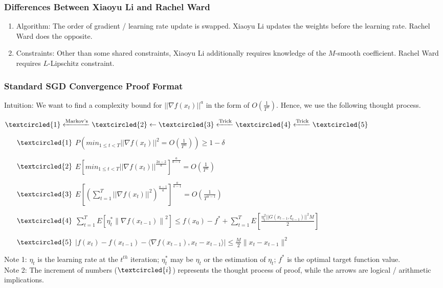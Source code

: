 \documentclass{beamer}
\begin{document}
\begin{frame}
\frametitle{Differences Between Xiaoyu Li and Rachel Ward}
\begin{enumerate}
    \item Algorithm: The order of gradient / learning rate update is swapped. Xiaoyu Li updates the weights before the learning rate. Rachel Ward does the opposite.
    \item Constraints: Other than some shared constraints, Xiaoyu Li additionally requires knowledge of the $M$-smooth coefficient. Rachel Ward requires $L$-Lipschitz constraint.
\end{enumerate}

\end{frame}

\begin{frame}
\frametitle{Standard SGD Convergence Proof Format}
Intuition: We want to find a complexity bound for $||\nabla f(x_t)||^a$ in the form of $O(\frac{1}{T^\alpha})$. Hence, we use the following thought process.\par

$\textcircled{1} \xleftarrow{\text{Markov's}} \textcircled{2} \leftarrow \textcircled{3} \xleftarrow{\text{Trick}} \textcircled{4} \xleftarrow{\text{Trick}} \textcircled{5}$\par

\begin{enumerate}
        \item [$\textcircled{1}$] $P(min_{1 \leq t < T}||\nabla f(x_t)||^2 = O(\frac{1}{T^\alpha})) \geq 1 - \delta$
        \item [$\textcircled{2}$] $E\left[min_{1 \leq t < T}||\nabla f(x_t)||^{\frac{2a-2}{a}}\right]^{\frac{a}{a-1}} = O(\frac{1}{T^{\alpha}})$
        
        \item [$\textcircled{3}$] $E\left[(\sum_{t=1}^{T}||\nabla f(x_t)||^2)^\frac{a-1}{a}\right]^{\frac{a}{a-1}} = O(\frac{1}{T^{\alpha - 1}})$
        
        \item [$\textcircled{4}$] $ \sum_{t=1}^{T}  E\left[\eta_t^*\left\|\nabla f\left(x_{t-1}\right)\right\|^2\right] \leq f\left(x_0\right)-f^*+\sum_{t=1}^{T} E\left[\frac{\eta_t^2 ||G(x_{t-1}, \xi_{t-1})||^2 M}{2}\right]$

        \item [$\textcircled{5}$] $|f(x_t)-f(x_{t-1})-\langle\nabla f(x_{t-1}), x_t-x_{t-1}\rangle| \leq \frac{M}{2}\|x_t-x_{t-1}\|^2$
\end{enumerate} \par
Note 1: $\eta_t$ is the learning rate at the $t^{th}$ iteration; $\eta_t^*$ may be $\eta_t$ or the estimation of $\eta_t$; $f^*$ is the optimal target function value.\\
Note 2: The increment of numbers ($\textcircled{i}$) represents the thought process of proof, while the arrows are logical / arithmetic implications.
\end{frame}
\end{document}
